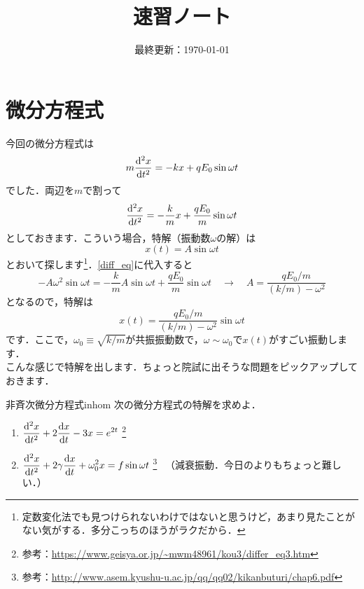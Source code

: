 \documentclass[a4paper,pdflatex,ja=standard]{bxjsarticle}
\title{速習ノート}
\author{\empty}
\date{最終更新：\today}
\theoremstyle{definition}
\begin{document}
\maketitle

\tableofcontents
\clearpage

\section{微分方程式}

今回の微分方程式は
\begin{equation}
  m\dv[2]{x}{t}
  =
  -kx
  +
  qE_0\sin\omega t
\end{equation}
でした．両辺を$m$で割って
\begin{equation}
  \dv[2]{x}{t}
  =
  -\frac{k}{m}x
  +
  \frac{qE_0}{m}\sin\omega t  
  \label{diff_eq}
\end{equation}
としておきます．こういう場合，特解（振動数$\omega$の解）は
\begin{equation}
  x(t)
  =
  A\sin \omega t
\end{equation}
とおいて探します\footnote{
  定数変化法でも見つけられないわけではないと思うけど，あまり見たことがない気がする．多分こっちのほうがラクだから．
}．\eqref{diff_eq}に代入すると
\begin{equation}
  -A\omega^2\sin\omega t
  =
  -\frac{k}{m}A\sin\omega t
  +
  \frac{qE_0}{m}\sin\omega t
  \quad
  \rightarrow
  \quad
  A
  =
  \frac{qE_0/m}{(k/m)-\omega^2}
\end{equation}
となるので，特解は
\begin{equation}
  x(t)
  =
  \frac{qE_0/m}{(k/m)-\omega^2}\sin\omega t
\end{equation}
です．ここで，$\omega_0\equiv\sqrt{k/m}$が共振振動数で，$\omega\sim\omega_0$で$x(t)$がすごい振動します．
\\

こんな感じで特解を出します．ちょっと院試に出そうな問題をピックアップしておきます．

\begin{mondai}{非斉次微分方程式}{inhom}
  次の微分方程式の特解を求めよ．
  \begin{enumerate}
    \item 
    ${\displaystyle
    \dv[2]{x}{t}+2\dv{x}{t}-3x=e^{2t}}$
    \footnote{
      参考：\url{https://www.geisya.or.jp/~mwm48961/kou3/differ_eq3.htm}
    }
    \item 
    ${
      \displaystyle
      \dv[2]{x}{t}+2\gamma\dv{x}{t}+\omega_0^2x
      =
      f\sin\omega t
    }$
    \footnote{
      参考：\url{http://www.asem.kyushu-u.ac.jp/qq/qq02/kikanbuturi/chap6.pdf}
    }
    \ （減衰振動．今日のよりもちょっと難しい．）
  \end{enumerate}
\end{mondai}
\end{document}
